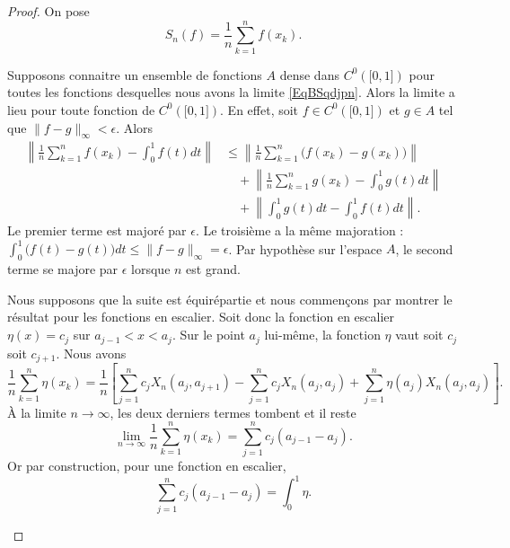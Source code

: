 \begin{proof}
	On pose
	\begin{equation}
		S_n(f)=\frac{1}{ n }\sum_{k=1}^nf(x_k).
	\end{equation}

	\begin{subproof}

		Supposons connaitre un ensemble de fonctions \( A\) dense dans \( C^0(\mathopen[ 0 , 1 \mathclose])\) pour toutes les fonctions desquelles nous avons la limite \eqref{EqBSqdjpn}. Alors la limite a lieu pour toute fonction de \( C^0(\mathopen[ 0 , 1 \mathclose])\). En effet, soit \( f\in C^0(\mathopen[ 0 , 1 \mathclose])\) et \( g\in A\) tel que \( \| f-g \|_{\infty}<\epsilon\). Alors
		\begin{subequations}
			\begin{align}
				\left\|   \frac{1}{ n }\sum_{k=1}^nf(x_k)-\int_0^1f(t)dt  \right\| & \leq \left\| \frac{1}{ n }\sum_{k=1}^n\big( f(x_k)-g(x_k)\big) \right\|  \\
				                                                                   & \quad+ \left\| \frac{1}{ n }\sum_{k=1}^n  g(x_k)-\int_0^1g(t)dt \right\| \\
				                                                                   & \quad+ \left\| \int_0^1g(t)dt-\int_0^1f(t)dt \right\|.
			\end{align}
		\end{subequations}
		Le premier terme est majoré par \( \epsilon\). Le troisième a la même majoration : \( \int_0^1\big(  f(t)-g(t)\big)dt\leq \| f-g \|_{\infty}=\epsilon\). Par hypothèse sur l'espace \( A\), le second terme se majore par \( \epsilon\) lorsque \( n\) est grand.

		\spitem[\ref{ItemKWcZTHqi}\( \Rightarrow\)\ref{ItemKWcZTHqii}]
		Nous supposons que la suite est équirépartie et nous commençons par montrer le résultat pour les fonctions en escalier. Soit donc la fonction en escalier \( \eta(x)=c_j\) sur \( a_{j-1}< x<a_j\). Sur le point \( a_j\) lui-même, la fonction \( \eta\) vaut soit \( c_j\) soit \( c_{j+1}\). Nous avons
		\begin{equation}    \label{EqohMuel}
			\frac{1}{ n }\sum_{k=1}^n\eta(x_k)=\frac{1}{ n }\left[  \sum_{j=1}^n c_jX_n(a_j,a_{j+1})-\sum_{j=1}^n c_jX_n(a_j,a_j)+\sum_{j=1}^n \eta(a_j)X_n(a_j,a_j) \right].
		\end{equation}
		À la limite \( n\to\infty\), les deux derniers termes tombent et il reste
		\begin{equation}
			\lim_{n\to \infty} \frac{1}{ n }\sum_{k=1}^n\eta(x_k)=\sum_{j=1}^n c_j(a_{j-1}-a_j).
		\end{equation}
		Or par construction, pour une fonction en escalier,
		\begin{equation}
			\sum_{j=1}^n c_j(a_{j-1}-a_j)=\int_0^1\eta.
		\end{equation}


\end{subproof}
\end{proof}
